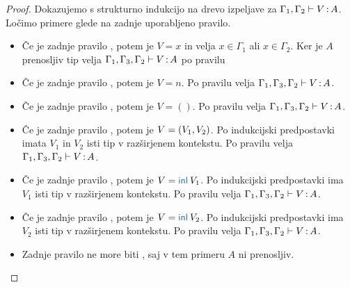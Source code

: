 \begin{proof}
	Dokazujemo s strukturno indukcijo na drevo izpeljave za $\Gamma_1, \Gamma_2 \vdash V \mathinner{:} A$.
	Ločimo primere glede na zadnje uporabljeno pravilo.
	
	\begin{itemize}
		\item[\sitem] Če je zadnje pravilo , potem je $V = x$ in velja $x \in \Gamma_1$ ali $x \in \Gamma_2$.
		Ker je $A$ prenosljiv tip velja $\Gamma_1, \Gamma_3, \Gamma_2 \vdash V \mathinner{:} A$ po pravilu 
		
		\item Če je zadnje pravilo , potem je $V = n$. Po pravilu  velja $\Gamma_1, \Gamma_3, \Gamma_2 \vdash V \mathinner{:} A$.
		
		\item Če je zadnje pravilo , potem je $V = ()$. Po pravilu  velja $\Gamma_1, \Gamma_3, \Gamma_2 \vdash V \mathinner{:} A$.
		
		\item Če je zadnje pravilo , potem je $V =( V_1 , V_2 )$. Po indukcijski predpostavki imata $V_1$ in $V_2$ isti tip v razširjenem kontekstu.
		Po pravilu  velja $\Gamma_1, \Gamma_3, \Gamma_2 \vdash V \mathinner{:} A$.
		
		\item Če je zadnje pravilo , potem je $V = \tminl{V_1}$. Po indukcijski predpostavki ima $V_1$ isti tip v razširjenem kontekstu.
		Po pravilu  velja $\Gamma_1, \Gamma_3, \Gamma_2 \vdash V \mathinner{:} A$.
		
		\item Če je zadnje pravilo , potem je $V = \tminl{V_2}$. Po indukcijski predpostavki ima $V_2$ isti tip v razširjenem kontekstu.
		Po pravilu  velja $\Gamma_1, \Gamma_3, \Gamma_2 \vdash V \mathinner{:} A$.
		
		\item Zadnje pravilo ne more biti , saj v tem primeru $A$ ni prenosljiv.
		

\end{itemize}
\end{proof}
